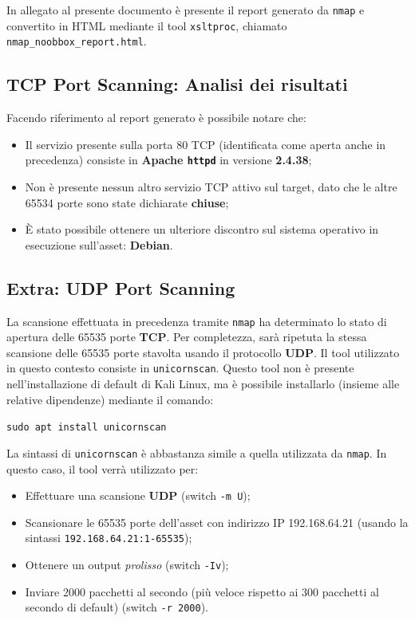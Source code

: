 \documentclass[a4paper, 12pt, oneside]{article}
\begin{document}
In allegato al presente documento è presente il report generato da \texttt{nmap} e convertito in HTML mediante il tool \texttt{xsltproc}, chiamato \texttt{nmap\_noobbox\_report.html}.

\subsection{TCP Port Scanning: Analisi dei risultati}
Facendo riferimento al report generato è possibile notare che:

\begin{itemize}
    \item Il servizio presente sulla porta 80 TCP (identificata come aperta anche in precedenza) consiste in \textbf{Apache \texttt{httpd}} in versione \textbf{2.4.38};
    \item Non è presente nessun altro servizio TCP attivo sul target, dato che le altre 65534 porte sono state dichiarate \textbf{chiuse};
    \item È stato possibile ottenere un ulteriore discontro sul sistema operativo in esecuzione sull'asset: \textbf{Debian}.
\end{itemize}

\subsection{Extra: UDP Port Scanning}
La scansione effettuata in precedenza tramite \texttt{nmap} ha determinato lo stato di apertura delle 65535 porte \textbf{TCP}. Per completezza, sarà ripetuta la stessa scansione delle 65535 porte stavolta usando il protocollo \textbf{UDP}. Il tool utilizzato in questo contesto consiste in \texttt{unicornscan}. Questo tool non è presente nell'installazione di default di Kali Linux, ma è possibile installarlo (insieme alle relative dipendenze) mediante il comando:

\begin{center}
    \texttt{sudo apt install unicornscan}
\end{center}

La sintassi di \texttt{unicornscan} \cite{unicornscan} è abbastanza simile a quella utilizzata da \texttt{nmap}. In questo caso, il tool verrà utilizzato per:

\begin{itemize}
    \item Effettuare una scansione \textbf{UDP} (switch \texttt{-m U});
    \item Scansionare le 65535 porte dell'asset con indirizzo IP 192.168.64.21 (usando la sintassi \texttt{192.168.64.21:1-65535});
    \item Ottenere un output \textit{prolisso} (switch \texttt{-Iv});
    \item Inviare 2000 pacchetti al secondo (più veloce rispetto ai 300 pacchetti al secondo di default) (switch \texttt{-r 2000}).
\end{itemize}
\end{document}
